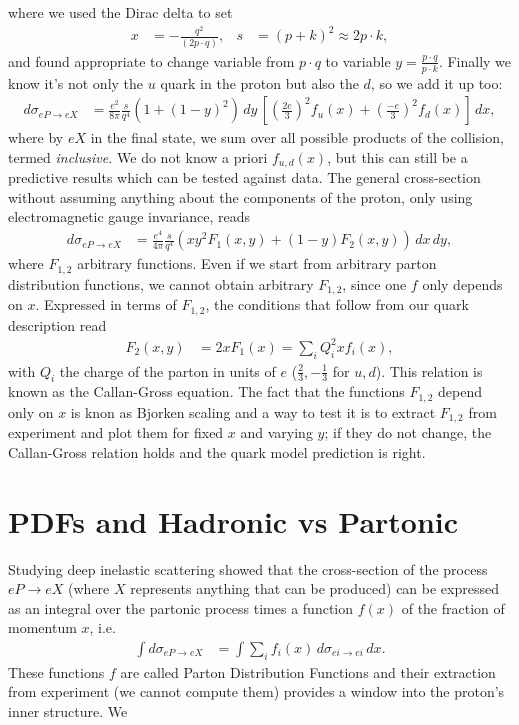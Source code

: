 \documentclass[relqm.tex]{subfiles}
\begin{document}
where we used the Dirac delta to set
\begin{align}
    x &= -\frac{q^2}{(2p\cdot q)}, & s &= (p+k)^2\approx 2p\cdot k,
\end{align}
and found appropriate to change variable from $p\cdot q$ to variable $y=\frac{p\cdot q}{p\cdot k}$.
Finally we know it's not only the $u$ quark in the proton but also the $d$, so we add it up too:
\begin{align}
    d\sigma_{eP\to eX} &= \frac{e^2}{8\pi}\frac{s}{q^4}\left(1+(1-y)^2\right)\,dy\,\left[\left(\frac{2e}{3}\right)^2f_u(x) + \left(\frac{-e}{3}\right)^2f_d(x)\right]\,dx,
\end{align}
where by $eX$ in the final state, we sum over all possible products of the collision, termed \emph{inclusive.}
We do not know a priori $f_{u,d}(x)$, but this can still be a predictive results which can be tested against data.
The general cross-section without assuming anything about the components of the proton, only using electromagnetic gauge invariance, reads
\begin{align}
    d\sigma_{eP\to eX} &= \frac{e^4}{4\pi}\frac{s}{q^4}\left(xy^2F_1(x,y) + (1-y)F_2(x,y)\right)\,dx\,dy,
\end{align}
where $F_{1,2}$ arbitrary functions. 
Even if we start from arbitrary parton distribution functions, we cannot obtain arbitrary $F_{1,2}$, since one $f$ only depends on $x$. 
Expressed in terms of $F_{1,2}$, the conditions that follow from our quark description read
\begin{align}
    F_2(x,y) &= 2xF_1(x) = \sum_i Q_i^2 xf_i(x),
\end{align}
with $Q_i$ the charge of the parton in units of $e$ ($\frac23,-\frac13$ for $u,d$).
This relation is known as the Callan-Gross equation. 
The fact that the functions $F_{1,2}$ depend only on $x$ is knon as Bjorken scaling and a way to test it is to extract $F_{1,2}$ from experiment and plot them for fixed $x$ and varying $y$; if they do not change, the Callan-Gross relation holds and the quark model prediction is right.

\chapter{PDFs and Hadronic vs Partonic}
Studying deep inelastic scattering showed that the cross-section of the process $eP\to eX$ (where $X$ represents anything that can be produced) can be expressed as an integral over the partonic process times a function $f(x)$ of the fraction of momentum $x$, i.e.
\begin{align}
    \int d\sigma_{eP\to eX} &= \int \sum_i f_i(x)\,d\sigma_{ei\to ei}\,dx.
\end{align}
These functions $f$ are called Parton Distribution Functions and their extraction from experiment (we cannot compute them) provides a window into the proton's inner structure. 
We
\end{document}
